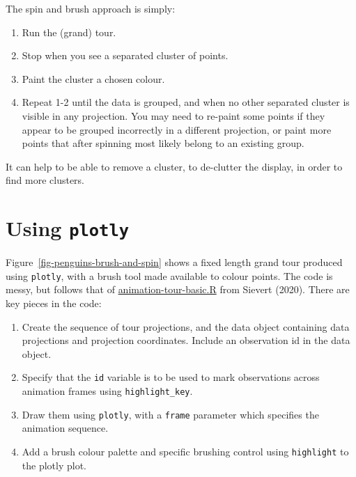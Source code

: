 \documentclass[
  letterpaper,
]{book}
\providecommand{\tightlist}{%
  \setlength{\itemsep}{0pt}\setlength{\parskip}{0pt}}\usepackage{longtable,booktabs,array}
\begin{document}
The spin and brush approach is simply:

\begin{enumerate}
\def\labelenumi{\arabic{enumi}.}
\tightlist
\item
  Run the (grand) tour.
\item
  Stop when you see a separated cluster of points.
\item
  Paint the cluster a chosen colour.
\item
  Repeat 1-2 until the data is grouped, and when no other separated
  cluster is visible in any projection. You may need to re-paint some
  points if they appear to be grouped incorrectly in a different
  projection, or paint more points that after spinning most likely
  belong to an existing group.
\end{enumerate}

It can help to be able to remove a cluster, to de-clutter the display,
in order to find more clusters.

\hypertarget{using-plotly}{%
\section{\texorpdfstring{Using
\texttt{plotly}}{Using plotly}}\label{using-plotly}}

Figure~\ref{fig-penguins-brush-and-spin} shows a fixed length grand tour
produced using \texttt{plotly}, with a brush tool made available to
colour points. The code is messy, but follows that of
\href{https://github.com/plotly/plotly.R/blob/master/demo/animation-tour-basic.R}{animation-tour-basic.R}
from Sievert (2020). There are key pieces in the code:

\begin{enumerate}
\def\labelenumi{\arabic{enumi}.}
\tightlist
\item
  Create the sequence of tour projections, and the data object
  containing data projections and projection coordinates. Include an
  observation id in the data object.
\item
  Specify that the \texttt{id} variable is to be used to mark
  observations across animation frames using \texttt{highlight\_key}.
\item
  Draw them using \texttt{plotly}, with a \texttt{frame} parameter which
  specifies the animation sequence.
\item
  Add a brush colour palette and specific brushing control using
  \texttt{highlight} to the plotly plot.
\end{enumerate}
\end{document}

